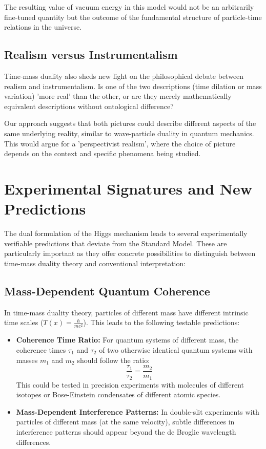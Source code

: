 \documentclass[a4paper,12pt]{article}
\newcommand{\Tfield}{T(x)} %
\begin{document}
	The resulting value of vacuum energy in this model would not be an arbitrarily fine-tuned quantity but the outcome of the fundamental structure of particle-time relations in the universe.
	
	\subsection{Realism versus Instrumentalism}
	
	Time-mass duality also sheds new light on the philosophical debate between realism and instrumentalism. Is one of the two descriptions (time dilation or mass variation) 'more real' than the other, or are they merely mathematically equivalent descriptions without ontological difference?
	
	Our approach suggests that both pictures could describe different aspects of the same underlying reality, similar to wave-particle duality in quantum mechanics. This would argue for a 'perspectivist realism', where the choice of picture depends on the context and specific phenomena being studied.
	
	\section{Experimental Signatures and New Predictions}
	
	The dual formulation of the Higgs mechanism leads to several experimentally verifiable predictions that deviate from the Standard Model. These are particularly important as they offer concrete possibilities to distinguish between time-mass duality theory and conventional interpretation:
	
	\subsection{Mass-Dependent Quantum Coherence}
	
	In time-mass duality theory, particles of different mass have different intrinsic time scales ($\Tfield = \frac{\hbar}{mc^2}$). This leads to the following testable predictions:
	
	\begin{itemize}
		\item \textbf{Coherence Time Ratio:} For quantum systems of different mass, the coherence times $\tau_1$ and $\tau_2$ of two otherwise identical quantum systems with masses $m_1$ and $m_2$ should follow the ratio:
		\begin{equation}
			\frac{\tau_1}{\tau_2} = \frac{m_2}{m_1}
		\end{equation}
		This could be tested in precision experiments with molecules of different isotopes or Bose-Einstein condensates of different atomic species.
		
		\item \textbf{Mass-Dependent Interference Patterns:} In double-slit experiments with particles of different mass (at the same velocity), subtle differences in interference patterns should appear beyond the de Broglie wavelength differences.
	\end{itemize}
	
\end{document}
